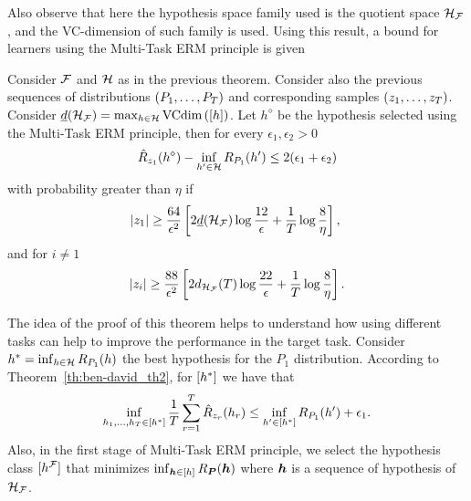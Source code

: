 Also observe that here the hypothesis space family used is the quotient space $\mathcal{H}_{\mathcal{F}}$, and the VC-dimension of such family is used.
%
Using this result, a bound for learners using the Multi-Task ERM principle is given~\cite[Theorem~3]{Ben-DavidB08}
\begin{theorem}\label{th:ben-david_th3}
    Consider $\mathcal{F}$ and $\mathcal{H}$ as in the previous theorem. Consider also the previous sequences of distributions $(P_1, \ldots, P_T)$ and corresponding samples $(z_1, \ldots, z_T)$. Consider $\underline{d}(\mathcal{H}_{\mathcal{F}}) = \max_{h \in \mathcal{H}} \text{VCdim}\left(\lbrack h\rbrack\right)$.
    Let $h^\diamond$ be the hypothesis selected using the Multi-Task ERM principle, then for every $\epsilon_1, \epsilon_2 > 0$
    \begin{equation}
        \nonumber
        {\hat{R}_{z_1}(h^\diamond) - \inf_{h' \in \mathcal{H}}R_{P_1}(h')}  \leq 2(\epsilon_1 + \epsilon_2)
    \end{equation}
    with probability greater than $\eta$ if
    \begin{equation}
        \label{eq:ben-david_th3_ineq1}
        \cardinal{\sample_1} \geq  \frac{64}{\epsilon^2} \left[2 \underline{d}(\hypspace_\frelset) \log \frac{12}{\epsilon} + \frac{1}{\ntasks}\log\frac{8}{\eta} \right], \; 
    \end{equation}
    and for $i \neq 1$
    \begin{equation}
        \label{eq:ben-david_th3_ineq2}
        \cardinal{\sample_i} \geq  \frac{88}{\epsilon^2} \left[2 d_{\hypspace_\frelset}(\ntasks) \log \frac{22}{\epsilon} + \frac{1}{\ntasks}\log\frac{8}{\eta} \right] .
    \end{equation}
\end{theorem}
The idea of the proof of this theorem helps to understand how using different tasks can help to improve the performance in the target task. 
Consider $h^* = \inf_{h \in \mathcal{H}} R_{P_1}(h)$ the best hypothesis for the $P_1$ distribution.
According to Theorem~\ref{th:ben-david_th2}, for $\lbrack h^*\rbrack$ we have that
\begin{equation}
    \nonumber
    {\inf_{h_1, \ldots, h_T\in \lbrack h^*\rbrack} \frac{1}{T} \sum_{r=1}^T\hat{R}_{z_r}(h_r) \leq \inf_{h' \in \lbrack h^*\rbrack}R_{P_1}(h')}  + \epsilon_1.
\end{equation}
%
Also, in the first stage of Multi-Task ERM principle, we select the hypothesis class $\lbrack h^{\mathcal{F}}\rbrack$ that minimizes $\inf_{\bm{h} \in \lbrack h\rbrack} R_{\bm{P}}(\bm{h})$ where $\bm{h}$ is a sequence of hypothesis of $\mathcal{H}_{\mathcal{F}}$.
